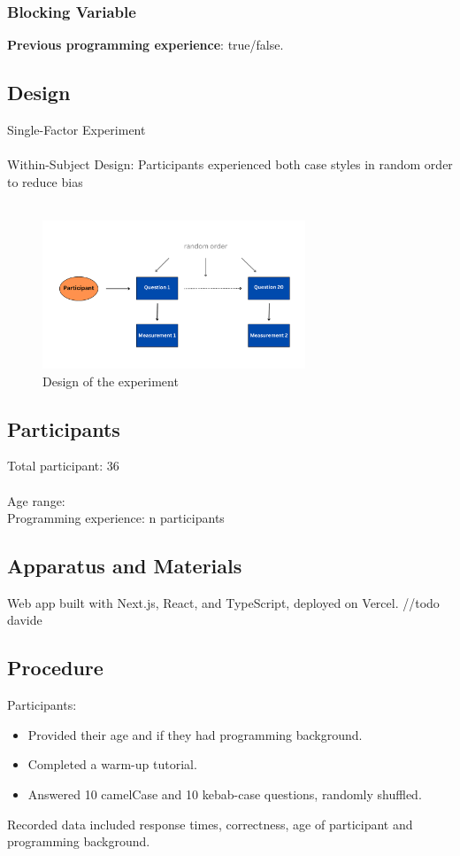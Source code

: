 \documentclass[unicode,11pt,a4paper,oneside,numbers=endperiod,openany]{scrartcl}
\begin{document}
\subsubsection{Blocking Variable}
\textbf{Previous programming experience}: true/false.

\subsection{Design}
Single-Factor Experiment \\
\hfill \\
Within-Subject Design: Participants experienced both case styles in random order to reduce bias \\
\hfill \\
\begin{figure}[h]
    \centering
    \includegraphics[width=0.7\textwidth]{./figures/graph.pdf}
    \caption{Design of the experiment}
    \label{fig:graph}
\end{figure}

\subsection{Participants}
Total participant: 36 \\
\hfill \\
Age range:  \\
Programming experience: n participants 

\subsection{Apparatus and Materials}
Web app built with Next.js, React, and TypeScript, deployed on Vercel. //todo davide

\subsection{Procedure}
Participants:
\begin{itemize}
    \item Provided their age and if they had programming background.
    \item Completed a warm-up tutorial.
    \item Answered 10 camelCase and 10 kebab-case questions, randomly shuffled.
\end{itemize}
Recorded data included response times, correctness, age of participant and programming background.
\end{document}
